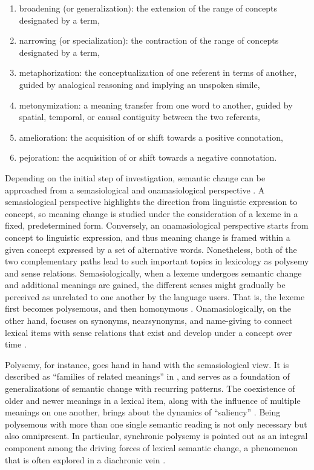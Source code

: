 \begin{enumerate}[label={(\arabic*)},nolistsep]
\item broadening (or generalization): the extension of the range of concepts designated by a term, 
\item narrowing (or specialization): the contraction of the range of concepts designated by a term, 
\item metaphorization: the conceptualization of one referent in terms of another, guided by analogical reasoning and implying an unspoken simile, 
\item metonymization: a meaning transfer from one word to another, guided by spatial, temporal, or causal contiguity between the two referents, 
\item amelioration: the acquisition of or shift towards a positive connotation,
\item pejoration: the acquisition of or shift towards a negative connotation.
\end{enumerate}
\vspace*{\baselineskip}

Depending on the initial step of investigation, semantic change can be approached from a semasiological and onamasiological perspective \parencites[17]{geeraerts1997diachronic}[25]{traugott2001regularity}. A semasiological perspective highlights the direction from linguistic expression to concept, so meaning change is studied under the consideration of a lexeme in a fixed, predetermined form. Conversely, an onamasiological perspective starts from concept to linguistic expression, and thus meaning change is framed within a given concept expressed by a set of alternative words. Nonetheless, both of the two complementary paths lead to such important topics in lexicology as polysemy and sense relations. Semasiologically, when a lexeme undergoes semantic change and additional meanings are gained, the different senses might gradually be perceived as unrelated to one another by the language users. That is, the lexeme first becomes polysemous, and then homonymous \parencite[25]{traugott2001regularity}. Onamasiologically, on the other hand, focuses on synonyms, near­synonyms, and name-­giving to connect lexical items with sense relations that exist and develop under a concept over time \parencite[17]{geeraerts1997diachronic}.

Polysemy, for instance, goes hand in hand with the semasiological view. It is described as ``families of related meanings'' in \textcite[11]{traugott2001regularity}, and serves as a foundation of generalizations of semantic change with recurring patterns. The co­existence of older and newer meanings in a lexical item, along with the influence of multiple meanings on one another, brings about the dynamics of ``saliency'' \parencite[12]{traugott2001regularity}. Being polysemous with more than one single semantic reading is not only necessary but also omnipresent. In particular, synchronic polysemy is pointed out as an integral component among the driving forces of lexical semantic change, a phenomenon that is often explored in a diachronic vein \parencite{robertinvanhove2008}.


